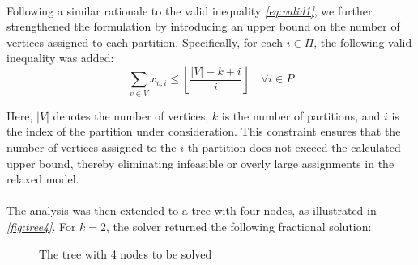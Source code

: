 \paragraph{} Following a similar rationale to the valid inequality \textsl{\eqref{eq:valid1}}, we further strengthened the formulation by introducing an upper bound on the number of vertices assigned to each partition. Specifically, for each $i \in \Pi$, the following valid inequality was added:
\begin{equation}
    \sum_{v \in V} x_{v,i} \leq \left\lfloor \frac{|V| - k + i}{i} \right\rfloor \quad \forall i \in P \label{eq:valid2}
\end{equation}

Here, $|V|$ denotes the number of vertices, $k$ is the number of partitions, and $i$ is the index of the partition under consideration. This constraint ensures that the number of vertices assigned to the $i$-th partition does not exceed the calculated upper bound, thereby eliminating infeasible or overly large assignments in the relaxed model.




\paragraph{} The analysis was then extended to a tree with four nodes, as illustrated in \textsl{\autoref{fig:tree4}}. For $k=2$, the solver returned the following fractional solution:

\begin{figure}[h]
    \centering
    
    \caption{The tree with 4 nodes to be solved}
    \label{fig:tree4}
\end{figure}
